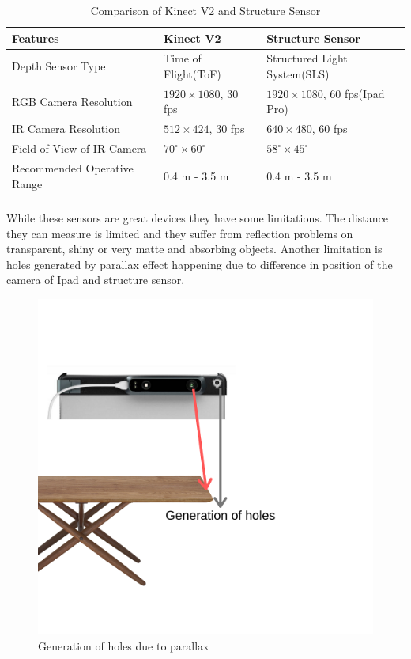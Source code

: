 \begin{table}[h]
\begin{tabular}{@{}lll@{}}
\toprule
\textbf{Features}                    & \textbf{Kinect V2}           & \textbf{Structure Sensor}         \\ \midrule
Depth Sensor Type           & Time of Flight(ToF) & Structured Light System(SLS)                 \\
RGB Camera Resolution       & $1920\times1080$, 30 fps & $1920\times1080$, 60 fps(Ipad Pro)     \\
IR Camera Resolution        & $512\times424$, 30 fps   & $640\times480$, 60 fps                 \\ 
Field of View of IR Camera  & $70^\circ\times60^\circ$           & $58^\circ\times45^\circ$                         \\
Recommended Operative Range & 0.4 m - 3.5 m       & 0.4 m - 3.5 m                                  \\
                            &                     &                                               
\end{tabular}
\caption{Comparison of Kinect V2 and Structure Sensor}
\label{table:KinectVsStructureSensor}
\end{table}

While these sensors are great devices they have some limitations. The distance they can measure is limited and they suffer from reflection problems on transparent, shiny or very matte and absorbing objects. Another limitation is holes generated by parallax effect happening due to difference in position of the camera of Ipad and structure sensor\cite{Kalantari}.
\begin{figure}[h]
    \centering
    \includegraphics[scale=0.4]{Figures/holes.png}
    \caption{Generation of holes due to parallax}
    \label{fig:holes}
\end{figure}


